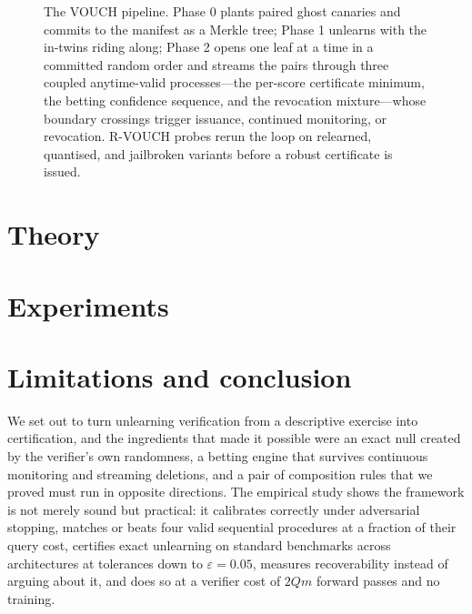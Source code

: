 \documentclass[pdflatex,sn-mathphys-num]{sn-jnl}
\theoremstyle{thmstyleone}
\theoremstyle{thmstyletwo}
\theoremstyle{thmstylethree}
\newcommand{\eps}{\varepsilon}
\begin{document}
\begin{figure}[t]
{}
\caption{The VOUCH pipeline. Phase 0 plants paired ghost canaries and commits to the
manifest as a Merkle tree; Phase 1 unlearns with the in-twins riding along; Phase 2
opens one leaf at a time in a committed random order and streams the pairs through
three coupled anytime-valid processes---the per-score certificate minimum, the betting
confidence sequence, and the revocation mixture---whose boundary crossings trigger
issuance, continued monitoring, or revocation. R-VOUCH probes rerun the loop on
relearned, quantised, and jailbroken variants before a robust certificate is issued.}
\label{fig:flowchart}
\end{figure}

\section{Theory}\label{sec:theory}


\section{Experiments}\label{sec:exp}


\section{Limitations and conclusion}\label{sec:conclusion}

We set out to turn unlearning verification from a descriptive exercise into
certification, and the ingredients that made it possible were an exact null created by
the verifier's own randomness, a betting engine that survives continuous monitoring and
streaming deletions, and a pair of composition rules that we proved must run in
opposite directions. The empirical study shows the framework is not merely sound but
practical: it calibrates correctly under adversarial stopping, matches or beats four
valid sequential procedures at a fraction of their query cost, certifies exact
unlearning on standard benchmarks across architectures at tolerances down to
$\eps = 0.05$, measures recoverability instead of arguing about it, and does so at a
verifier cost of $2Qm$ forward passes and no training.
\end{document}
